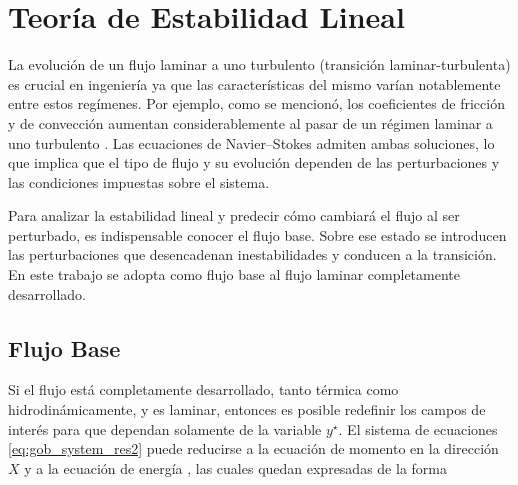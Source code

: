 \section{Teoría de Estabilidad Lineal} \label{line_an}

La evolución de un flujo laminar a uno turbulento (transición laminar-turbulenta) es crucial en ingeniería ya que las características del mismo varían notablemente entre estos regímenes. Por ejemplo, como se mencionó, los coeficientes de fricción y de convección aumentan considerablemente al pasar de un régimen laminar a uno turbulento \cite{machaca2024}. Las ecuaciones de Navier–Stokes admiten ambas soluciones, lo que implica que el tipo de flujo y su evolución dependen de las perturbaciones y las condiciones impuestas sobre el sistema. 

Para analizar la estabilidad lineal y predecir cómo cambiará el flujo al ser perturbado, es indispensable conocer el flujo base. Sobre ese estado se introducen las perturbaciones que desencadenan inestabilidades y conducen a la transición. En este trabajo se adopta como flujo base al flujo laminar completamente desarrollado. 


\subsection{Flujo Base} \label{sec:fbase}

Si el flujo está completamente desarrollado, tanto térmica como hidrodinámicamente, y es laminar, entonces es posible redefinir los campos de interés para que dependan solamente de la variable $y^{\star}$. El sistema de ecuaciones \ref{eq:gob_system_res2} puede reducirse a la ecuación de momento en la dirección $X$ y a la ecuación de energía \cite{chen1996linear}, las cuales quedan expresadas de la forma 

